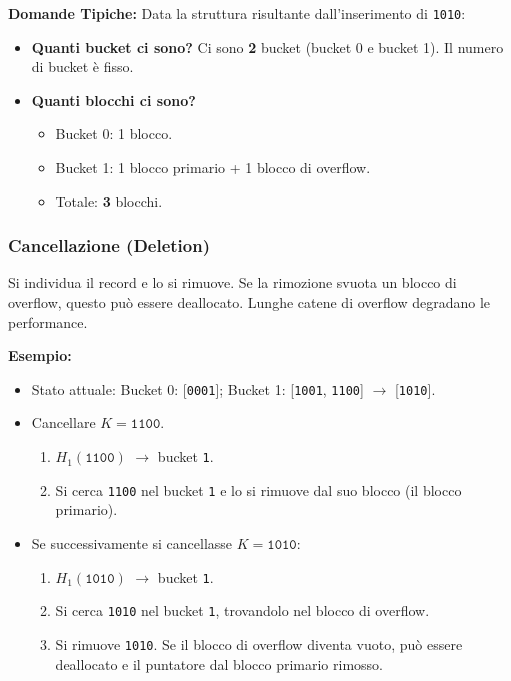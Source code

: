 \textbf{Domande Tipiche:}
Data la struttura risultante dall'inserimento di \texttt{1010}:
\begin{itemize}
    \item \textbf{Quanti bucket ci sono?} Ci sono \textbf{2} bucket (bucket 0 e bucket 1). Il numero di bucket è fisso.
    \item \textbf{Quanti blocchi ci sono?}
    \begin{itemize}
        \item Bucket 0: 1 blocco.
        \item Bucket 1: 1 blocco primario + 1 blocco di overflow.
        \item Totale: \textbf{3} blocchi.
    \end{itemize}
\end{itemize}

\subsubsection{Cancellazione (Deletion)}
Si individua il record e lo si rimuove. Se la rimozione svuota un blocco di overflow, questo può essere deallocato. Lunghe catene di overflow degradano le performance.

\textbf{Esempio:}
\begin{itemize}
    \item Stato attuale: Bucket 0: [\texttt{0001}]; Bucket 1: [\texttt{1001}, \texttt{1100}] $\rightarrow$ [\texttt{1010}].
    \item Cancellare $K = \texttt{1100}$.
    \begin{enumerate}
        \item $H_1(\texttt{1100})$ $\rightarrow$ bucket \texttt{1}.
        \item Si cerca \texttt{1100} nel bucket \texttt{1} e lo si rimuove dal suo blocco (il blocco primario).
    \end{enumerate}
    \item Se successivamente si cancellasse $K = \texttt{1010}$:
    \begin{enumerate}
        \item $H_1(\texttt{1010})$ $\rightarrow$ bucket \texttt{1}.
        \item Si cerca \texttt{1010} nel bucket \texttt{1}, trovandolo nel blocco di overflow.
        \item Si rimuove \texttt{1010}. Se il blocco di overflow diventa vuoto, può essere deallocato e il puntatore dal blocco primario rimosso.
    \end{enumerate}
\end{itemize}

